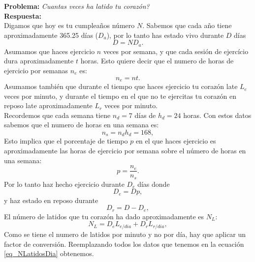 \begin{example}
\begin{tcolorbox}[colback=green!5!white,colframe=green!75!black,boxrule=0.5pt,arc=4pt,left=6pt,right=6pt,top=6pt,bottom=6pt,boxsep=0pt]
\textbf{Problema:} \textit{Cuantas veces ha latido tu corazón?}\\
\textbf{Respuesta:}\\ 
Digamos que hoy es tu cumplea\~nos n\'umero $N$. Sabemos que cada a\~no tiene aproximadamente 365.25 d\'ias ($D_a$), por lo tanto has estado vivo durante $D$ d\'ias \\
\begin{equation}
D = N D_{a}.
\end{equation}
Asumamos que haces ejercicio $n$ veces por semana, y que cada sesi\'on de ejercício dura aproximadamente $t$ horas. Esto quiere decir que el numero de horas de ejercicio por semanas $n_e$ es:
\begin{equation}
n_e = nt.
\end{equation} 
Asumamos tambi\'en que durante el tiempo que haces ejercicio tu coraz\'on late $L_{e}$ veces por minuto, y durante el tiempo en el que no te ejercitas tu coraz\'on en reposo late aproximadamente $L_{r}$ veces por minuto. \\
Recordemos que cada semana tiene $n_d = 7$ d\'ias de $h_d = 24$ horas. Con estos datos sabemos que el numero de horas en una semana es:
\begin{equation}
n_s = n_d h_d = 168,
\end{equation}
Esto implica que el porcentaje de tiempo $p$ en el que haces ejercicio es aproximadamente las horas de ejercicio por semana sobre el n\'umero de horas en una semana:
\begin{equation}
p = \frac{n_e}{n_s}. 
\end{equation}
Por lo tanto haz hecho ejercicio durante $D_e$ d\'ias donde
\begin{equation}
D_e = D p, 
\end{equation} 
y haz estado en reposo durante
\begin{equation}
D_r = D - D_e, 
\end{equation} 
El n\'umero de latidos que tu coraz\'on ha dado aproximadamente es $N_L$:  
\begin{equation}
\label{eq_NLatidosDia}
N_L = D_e L_{e/dia}  + D_r L_{r/dia}, 
\end{equation} 
Como se tiene el numero de latidos por minuto y no por d\'ia, hay que aplicar un factor de conversi\'on. Reemplazando todos los datos que tenemos en la ecuaci\'on \ref{eq_NLatidosDia} obtenemos. 

\end{tcolorbox}
\end{example}
